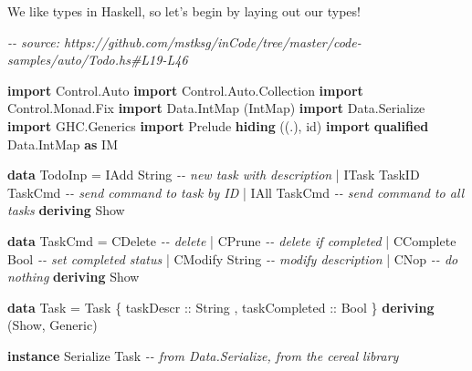 \documentclass[]{article}
\newenvironment{Shaded}{}{}
\newcommand{\CommentTok}[1]{\textcolor[rgb]{0.38,0.63,0.69}{\textit{#1}}}
\newcommand{\DataTypeTok}[1]{\textcolor[rgb]{0.56,0.13,0.00}{#1}}
\newcommand{\KeywordTok}[1]{\textcolor[rgb]{0.00,0.44,0.13}{\textbf{#1}}}
\newcommand{\NormalTok}[1]{#1}
\newcommand{\OperatorTok}[1]{\textcolor[rgb]{0.40,0.40,0.40}{#1}}
\newcommand{\OtherTok}[1]{\textcolor[rgb]{0.00,0.44,0.13}{#1}}
\begin{document}
We like types in Haskell, so let's begin by laying out our types!

\begin{Shaded}
\begin{Highlighting}[]
\CommentTok{{-}{-} source: https://github.com/mstksg/inCode/tree/master/code{-}samples/auto/Todo.hs\#L19{-}L46}

\KeywordTok{import} \DataTypeTok{Control.Auto}
\KeywordTok{import} \DataTypeTok{Control.Auto.Collection}
\KeywordTok{import} \DataTypeTok{Control.Monad.Fix}
\KeywordTok{import} \DataTypeTok{Data.IntMap}\NormalTok{             (}\DataTypeTok{IntMap}\NormalTok{)}
\KeywordTok{import} \DataTypeTok{Data.Serialize}
\KeywordTok{import} \DataTypeTok{GHC.Generics}
\KeywordTok{import} \DataTypeTok{Prelude} \KeywordTok{hiding}\NormalTok{          ((.), id)}
\KeywordTok{import} \KeywordTok{qualified} \DataTypeTok{Data.IntMap}   \KeywordTok{as} \DataTypeTok{IM}

\KeywordTok{data} \DataTypeTok{TodoInp} \OtherTok{=} \DataTypeTok{IAdd}  \DataTypeTok{String}           \CommentTok{{-}{-} new task with description}
             \OperatorTok{|} \DataTypeTok{ITask} \DataTypeTok{TaskID} \DataTypeTok{TaskCmd}   \CommentTok{{-}{-} send command to task by ID}
             \OperatorTok{|} \DataTypeTok{IAll} \DataTypeTok{TaskCmd}           \CommentTok{{-}{-} send command to all tasks}
             \KeywordTok{deriving} \DataTypeTok{Show}

\KeywordTok{data} \DataTypeTok{TaskCmd} \OtherTok{=} \DataTypeTok{CDelete}          \CommentTok{{-}{-} delete}
             \OperatorTok{|} \DataTypeTok{CPrune}           \CommentTok{{-}{-} delete if completed}
             \OperatorTok{|} \DataTypeTok{CComplete} \DataTypeTok{Bool}   \CommentTok{{-}{-} set completed status}
             \OperatorTok{|} \DataTypeTok{CModify} \DataTypeTok{String}   \CommentTok{{-}{-} modify description}
             \OperatorTok{|} \DataTypeTok{CNop}             \CommentTok{{-}{-} do nothing}
             \KeywordTok{deriving} \DataTypeTok{Show}

\KeywordTok{data} \DataTypeTok{Task} \OtherTok{=} \DataTypeTok{Task}\NormalTok{ \{}\OtherTok{ taskDescr     ::} \DataTypeTok{String}
\NormalTok{                 ,}\OtherTok{ taskCompleted ::} \DataTypeTok{Bool}
\NormalTok{                 \} }\KeywordTok{deriving}\NormalTok{ (}\DataTypeTok{Show}\NormalTok{, }\DataTypeTok{Generic}\NormalTok{)}

\KeywordTok{instance} \DataTypeTok{Serialize} \DataTypeTok{Task} \CommentTok{{-}{-} from Data.Serialize, from the cereal library}
\end{Highlighting}
\end{Shaded}
\end{document}
